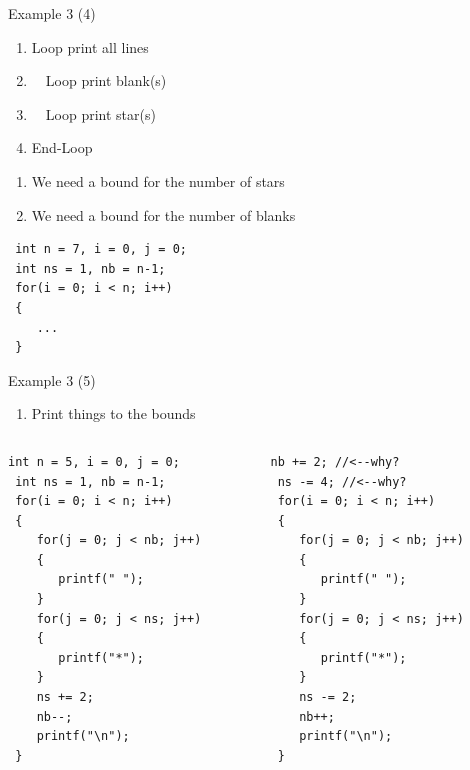 \begin{frame}[fragile]{Example 3 (4)}
\begin{enumerate}
	\item {Loop print all lines}
	\item {~~Loop print blank(s)}
	\item {~~Loop print star(s)}
	\item {End-Loop}
\end{enumerate}
\begin{enumerate}
	\item {We need a bound for the number of stars}
	\item {We need a bound for the number of blanks}
\end{enumerate}
\begin{lstlisting}
 int n = 7, i = 0, j = 0;
 int ns = 1, nb = n-1;
 for(i = 0; i < n; i++)
 {
    ...
 }
\end{lstlisting}
\end{frame}

\begin{frame}[fragile]{Example 3 (5)}
\begin{enumerate}
	\item {Print things to the bounds}
\end{enumerate}
\vspace{-0.2in}
\begin{columns}
\begin{column}{0.49\linewidth}
\begin{lstlisting}[numbers=none]
 int n = 5, i = 0, j = 0;
 int ns = 1, nb = n-1;
 for(i = 0; i < n; i++)
 {
    for(j = 0; j < nb; j++)
    {
       printf(" ");
    }
    for(j = 0; j < ns; j++)
    {
       printf("*");
    }
    ns += 2;
    nb--;
    printf("\n");
 }
\end{lstlisting}
\end{column}
\begin{column}{0.49\linewidth}
\begin{lstlisting}[numbers=none]
 nb += 2; //<--why?
 ns -= 4; //<--why?
 for(i = 0; i < n; i++)
 {
    for(j = 0; j < nb; j++)
    {
       printf(" ");
    }
    for(j = 0; j < ns; j++)
    {
       printf("*");
    }
    ns -= 2;
    nb++;
    printf("\n");
 }
\end{lstlisting}
\end{column}
\end{columns}
\end{frame}


